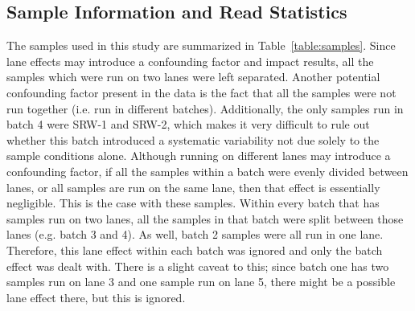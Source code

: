 \documentclass[12pt]{article}
\begin{document}
	\subsection{Sample Information and Read Statistics}
	The samples used in this study are summarized in Table~\ref{table:samples}. Since lane effects may introduce a confounding factor and impact results, all the samples which were run on two lanes were left separated. Another potential confounding factor present in the data is the fact that all the samples were not run together (i.e. run in different batches). Additionally, the only samples run in batch 4 were SRW-1 and SRW-2, which makes it very difficult to rule out whether this batch introduced a systematic variability not due solely to the sample conditions alone. Although running on different lanes may introduce a confounding factor, if all the samples within a batch were evenly divided between lanes, or all samples are run on the same lane, then that effect is essentially negligible. This is the case with these samples. Within every batch that has samples run on two lanes, all the samples in that batch were split between those lanes (e.g. batch 3 and 4). As well, batch 2 samples were all run in one lane. Therefore, this lane effect within each batch was ignored and only the batch effect was dealt with. There is a slight caveat to this; since batch one has two samples run on lane 3 and one sample run on lane 5, there might be a possible lane effect there, but this is ignored.
	
\end{document}
